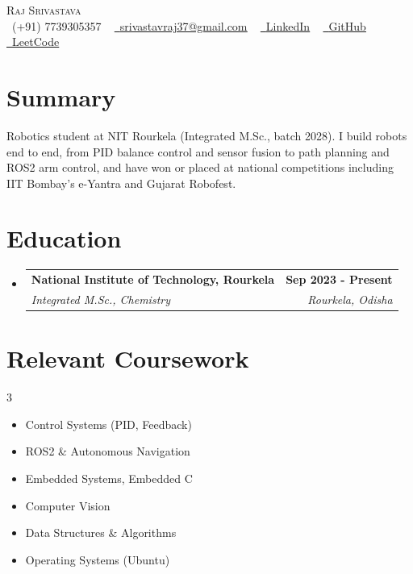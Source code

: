 \documentclass[letterpaper,11pt]{article}
\makeatletter
\newcommand{\resumeSubheading}[4]{
  \vspace{-2pt}\item
    \begin{tabular*}{1.0\textwidth}[t]{l@{\extracolsep{\fill}}r}
      \textbf{#1} & \textbf{\small #2} \\
      \textit{\small#3} & \textit{\small #4} \\
    \end{tabular*}\vspace{-7pt}
}
\newcommand{\resumeSubHeadingListStart}{\begin{itemize}[leftmargin=0.0in, label={}]}
\newcommand{\resumeSubHeadingListEnd}{\end{itemize}}
\makeatother
\begin{document}
\begin{center}
      {\Huge \scshape Raj Srivastava} \\ \vspace{4pt}
    \small \raisebox{-0.1\height}\faPhone\ (+91) 7739305357 ~ \href{mailto:srivastavraj37@gmail.com}{\raisebox{-0.2\height}\faEnvelope\  \underline{srivastavraj37@gmail.com}} ~
    \href{https://www.linkedin.com/in/raj-srivastava-b11790288/}{\raisebox{-0.2\height}\faLinkedin\ \underline{LinkedIn}}  ~
    \href{https://github.com/srivastavaraj37}{\raisebox{-0.2\height}\faGithub\ \underline{GitHub}} ~
    \href{https://leetcode.com/u/rajsrivastava3_0/}{\raisebox{-0.2\height}\faCode\ \underline{LeetCode}}
    \vspace{-8pt}
\end{center}

\section{Summary}
\small Robotics student at NIT Rourkela (Integrated M.Sc., batch 2028). I build robots end to end, from PID balance control and sensor fusion to path planning and ROS2 arm control, and have won or placed at national competitions including IIT Bombay's e-Yantra and Gujarat Robofest.
\vspace{-6pt}

\section{Education}
  \resumeSubHeadingListStart
    \resumeSubheading
      {National Institute of Technology, Rourkela}{Sep 2023 - Present}
      {Integrated M.Sc., Chemistry}{Rourkela, Odisha}
  \resumeSubHeadingListEnd

\section{Relevant Coursework}
\begin{multicols}{3}
\begin{itemize}[itemsep=-5pt, parsep=3pt]
    \item\small Control Systems (PID, Feedback)
    \item ROS2 \& Autonomous Navigation
    \item Embedded Systems, Embedded C
    \item Computer Vision
    \item Data Structures \& Algorithms
    \item Operating Systems (Ubuntu)
\end{itemize}
\end{multicols}
\vspace*{2.0\multicolsep}
\end{document}
